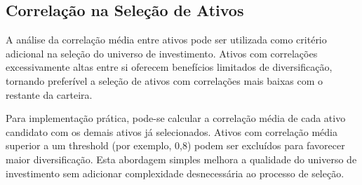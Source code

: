 \subsection{Correlação na Seleção de Ativos}

A análise da correlação média entre ativos pode ser utilizada como critério adicional na seleção do universo de investimento. Ativos com correlações excessivamente altas entre si oferecem benefícios limitados de diversificação, tornando preferível a seleção de ativos com correlações mais baixas com o restante da carteira.

Para implementação prática, pode-se calcular a correlação média de cada ativo candidato com os demais ativos já selecionados. Ativos com correlação média superior a um threshold (por exemplo, 0,8) podem ser excluídos para favorecer maior diversificação. Esta abordagem simples melhora a qualidade do universo de investimento sem adicionar complexidade desnecessária ao processo de seleção.